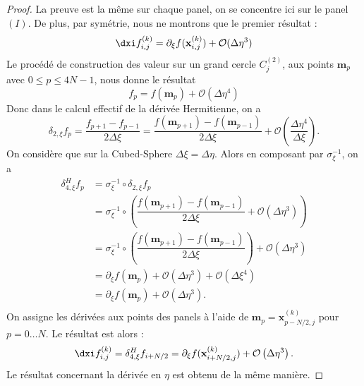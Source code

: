 \begin{proof}
La preuve est la même sur chaque panel, on se concentre ici sur le panel $(I)$. De plus, par symétrie, nous ne montrons que le premier résultat :
\begin{equation}
\dxi f_{i,j}^{(k)} = \partial_{\xi} f(\mathbf{x}_{i,j}^{(k)}) + \mathcal{O}(\Delta \eta^3)
\end{equation}
Le procédé de construction des valeur sur un grand cercle $C_j^{(2)}$, aux points $\mathbf{m}_p$ avec $0 \leq p \leq 4N-1$, nous donne le résultat
\begin{equation}
f_p = f(\mathbf{m}_p) + \mathcal{O}(\Delta \eta^4)
\end{equation}
Donc dans le calcul effectif de la dérivée Hermitienne, on a 
\begin{equation}
\delta_{2,\xi} f_p = \dfrac{f_{p+1} - f_{p-1}}{2 \Delta \xi} = \dfrac{f(\mathbf{m}_{p+1}) - f(\mathbf{m}_{p-1})}{2 \Delta \xi} + \mathcal{O}\left( \dfrac{\Delta \eta^4}{\Delta \xi} \right).
\end{equation}
On considère que sur la Cubed-Sphere $\Delta \xi = \Delta \eta$. Alors en composant par $\sigma_{\xi}^{-1}$, on a 
\begin{align*}
\delta_{4,\xi}^H f_p & = \sigma_{\xi}^{-1} \circ \delta_{2,\xi} f_p \\
                   & = \sigma_{\xi}^{-1} \circ \left( \dfrac{f(\mathbf{m}_{p+1}) - f(\mathbf{m}_{p-1})}{2 \Delta \xi} + \mathcal{O}\left( \Delta \eta^3 \right) \right)\\
                   & = \sigma_{\xi}^{-1} \circ \left( \dfrac{f(\mathbf{m}_{p+1}) - f(\mathbf{m}_{p-1})}{2 \Delta \xi}\right)  + \mathcal{O}\left( \Delta \eta^3 \right) \\
                   & = \partial_{\xi}f(\mathbf{m}_p) + \mathcal{O}\left( \Delta \eta^3 \right) + \mathcal{O}\left( \Delta \xi^4 \right) \\
                   & = \partial_{\xi}f(\mathbf{m}_p) + \mathcal{O}\left( \Delta \eta^3 \right).\\
\end{align*}
On assigne les dérivées aux points des panels à l'aide de $\mathbf{m}_p=\mathbf{x}^{(k)}_{p-N/2,j}$ pour $p = 0 \ldots N$. Le résultat est alors :
\begin{equation}
\dxi f^{(k)}_{i,j} = \delta_{4,\xi}^H f_{i+N/2} = \partial_{\xi} f(\mathbf{x}^{(k)}_{i+N/2,j}) + \mathcal{O}\left( \Delta \eta^3 \right).
\end{equation}
Le résultat concernant la dérivée en $\eta$ est obtenu de la même manière.
\end{proof}

